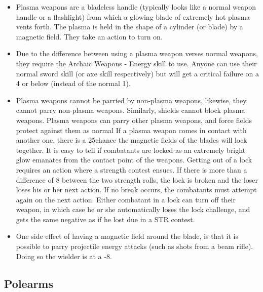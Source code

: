 \documentclass[twoside]{book}
\begin{document}
\begin{itemize}
      
  \item Plasma weapons are a bladeless handle (typically looks like a normal weapon handle or a flashlight) from which a glowing blade of extremely hot plasma vents forth. The plasma is held in the shape of a cylinder (or blade) by a magnetic field. They take an action to turn on.
  \item Due to the difference between using a plasma weapon verses normal weapons, they require the Archaic Weapons - Energy skill to use. Anyone can use their normal sword skill (or axe skill respectively) but will get a critical failure on a 4 or below (instead of the normal 1).
  \item Plasma weapons cannot be parried by non-plasma weapons, likewise, they cannot parry non-plasma weapons. Similarly, shields cannot block plasma weapons. Plasma weapons can parry other plasma weapons, and force fields protect against them as normal If a plasma weapon comes in contact with another one, there is a 25chance the magnetic fields of the blades will lock together. It is easy to tell if combatants are locked as an extremely bright glow emanates from the contact point of the weapons. Getting out of a lock requires an action where a strength contest ensues. If there is more than a difference of 8 between the two strength rolls, the lock is broken and the loser loses his or her next action. If no break occurs, the combatants must attempt again on the next action. Either combatant in a lock can turn off their weapon, in which case he or she automatically loses the lock challenge, and gets the same negative as if he lost due in a STR contest.
  \item One side effect of having a magnetic field around the blade, is that it is possible to parry projectile energy attacks (such as shots from a beam rifle). Doing so the wielder is at a -8.
\end{itemize}
  
    

\subsection{Polearms}
    
\end{document}

